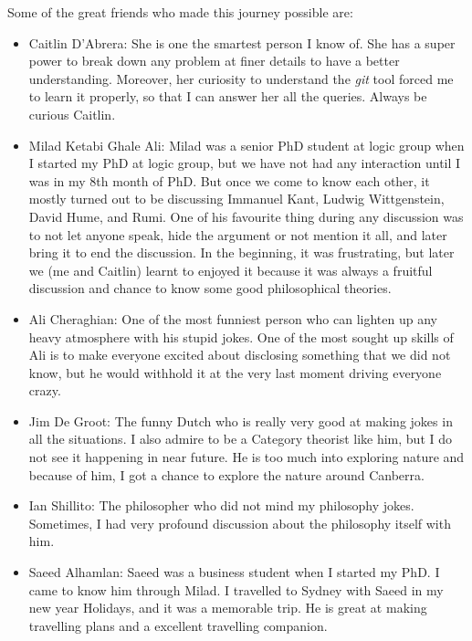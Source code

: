   
Some of the great friends who made this journey possible are:
\begin{itemize}
\item Caitlin D'Abrera: 
  She is one the smartest person I know of. She has a super power to break down any problem at finer details 
  to have a better understanding. Moreover, her curiosity to understand  the \textit{git} tool  forced me to learn it properly, 
  so that I can answer her all the queries. Always be curious Caitlin. 
  
 \item Milad Ketabi Ghale Ali: 
 Milad was a senior PhD student at logic group when I started my PhD at logic group, 
 but we have not had any interaction until I was in my 8th month of PhD. But once 
 we come to know each other, it mostly turned out to be discussing 
 Immanuel Kant, Ludwig Wittgenstein, David Hume, and Rumi. 
 One of his favourite thing during any discussion was to
 not let anyone speak, hide the argument or not mention it all, and later bring it 
 to end the discussion. In the beginning, it was frustrating, but later we (me and 
 Caitlin) learnt to enjoyed it because it was always a fruitful discussion
 and chance to know some good philosophical theories.  
 
 \item  Ali Cheraghian:
  One of the most funniest person who can lighten up any heavy atmosphere 
  with his stupid jokes.  One of the most sought up skills of Ali is to 
  make everyone excited about disclosing something that we did not know, 
  but he would withhold it at the  very last moment driving everyone crazy. 
  
 
  \item   Jim De Groot:
  The funny Dutch who is really very good at making jokes in all the situations. I also 
  admire to be a Category theorist like him, but I do not see it happening in near 
  future. He is too much into exploring nature and because of him, I got a chance 
  to explore the nature around Canberra. 
  
  \item  Ian Shillito:
  The philosopher who did not mind my philosophy jokes.  Sometimes, I had very 
  profound discussion about the philosophy itself with him. 
  
  
  
  \item Saeed Alhamlan: 
  Saeed was a business student when I started my PhD. I came to know him through 
  Milad. I travelled to Sydney with Saeed in my new year Holidays, and it was 
  a memorable trip. He is great at making travelling plans and a excellent travelling 
  companion. 
  
\end{itemize} 


